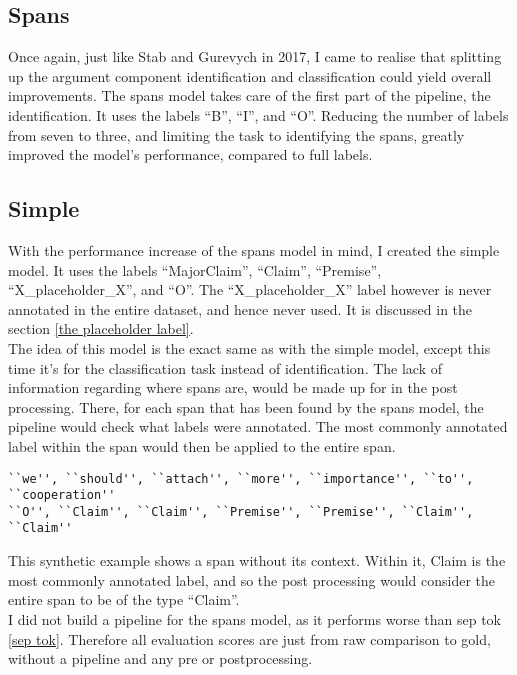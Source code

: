 \documentclass[12]{article}
\theoremstyle{mytheoremstyle}
\theoremstyle{mytheoremstyle}
\theoremstyle{myproblemstyle}
\begin{document}
  \subsection{Spans} \label{spans}
  Once again, just like Stab and Gurevych in 2017, I came to realise that splitting up the argument component identification and classification could yield overall improvements. 
  The spans model takes care of the first part of the pipeline, the identification. 
  It uses the labels ``B'', ``I'', and ``O''. Reducing the number of labels from seven to three, and limiting the task to identifying the spans, greatly improved the model's performance, compared to full labels.
  \subsection{Simple} \label{simple}
  With the performance increase of the spans model in mind, I created the simple model. It uses the labels ``MajorClaim'', ``Claim'', ``Premise'', ``X\_placeholder\_X'', and ``O''. 
  The ``X\_placeholder\_X'' label however is never annotated in the entire dataset, and hence never used. It is discussed in the section \ref{the placeholder label}.\\
 The idea of this model is the exact same as with the simple model, except this time it's for the classification task instead of identification. The lack of information regarding where spans are, would be made up for in the post processing. There, for each span that has been found by the spans model, the pipeline would check what labels were annotated. The most commonly annotated label within the span would then be applied to the entire span.  
  \begin{verbatim}
``we'', ``should'', ``attach'', ``more'', ``importance'', ``to'', ``cooperation''
``O'', ``Claim'', ``Claim'', ``Premise'', ``Premise'', ``Claim'', ``Claim''
  \end{verbatim}
  \vspace{-3.5ex}
  This synthetic example shows a span without its context. Within it, Claim is the most commonly annotated label, and so the post processing would consider the entire span to be of the type ``Claim''.\\ 
  I did not build a pipeline for the spans model, as it performs worse than sep tok \ref{sep tok}. 
  Therefore all evaluation scores are just from raw comparison to gold, without a pipeline and any pre or postprocessing.
\end{document}

